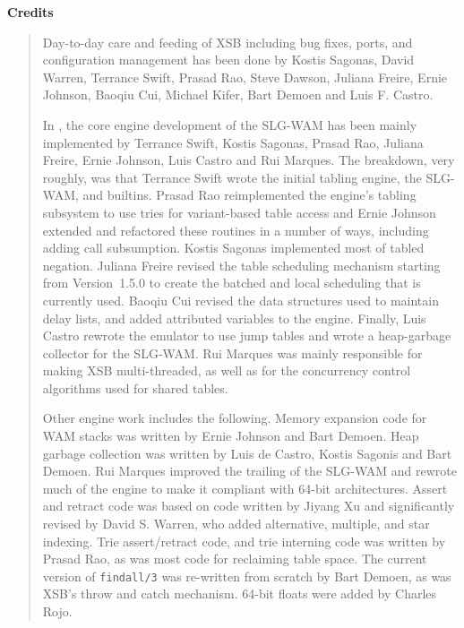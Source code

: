 \begin{center}
{\bf {\Large 
		Credits
}}
\end{center}


\begin{quote}
Day-to-day care and feeding of XSB including bug fixes, ports, and
configuration management has been done by Kostis Sagonas, David
Warren, Terrance Swift, Prasad Rao, Steve Dawson, Juliana Freire,
Ernie Johnson, Baoqiu Cui, Michael Kifer, Bart Demoen and Luis F.
Castro.

In \version, the core engine development of the SLG-WAM has been
mainly implemented by Terrance Swift, Kostis Sagonas, Prasad Rao,
Juliana Freire, Ernie Johnson, Luis Castro and Rui Marques.  The
breakdown, very roughly, was that Terrance Swift wrote the initial
tabling engine, the SLG-WAM, and builtins.  Prasad Rao reimplemented
the engine's tabling subsystem to use tries for variant-based table
access and Ernie Johnson extended and refactored these routines in a
number of ways, including adding call subsumption.  Kostis Sagonas
implemented most of tabled negation.  Juliana Freire revised the table
scheduling mechanism starting from Version~1.5.0 to create the batched
and local scheduling that is currently used.  Baoqiu Cui revised the
data structures used to maintain delay lists, and added attributed
variables to the engine.  Finally, Luis Castro rewrote the emulator to
use jump tables and wrote a heap-garbage collector for the SLG-WAM.
Rui Marques was mainly responsible for making XSB multi-threaded, as
well as for the concurrency control algorithms used for shared tables.

Other engine work includes the following.  Memory expansion code for
WAM stacks was written by Ernie Johnson and Bart Demoen.  Heap garbage
collection was written by Luis de Castro, Kostis Sagonis and Bart
Demoen.  Rui Marques improved the trailing of the SLG-WAM and rewrote
much of the engine to make it compliant with 64-bit architectures.
Assert and retract code was based on code written by Jiyang Xu and
significantly revised by David S. Warren, who added alternative,
multiple, and star indexing.  Trie assert/retract code, and trie
interning code was written by Prasad Rao, as was most code for
reclaiming table space. The current version of {\tt findall/3} was
re-written from scratch by Bart Demoen, as was XSB's throw and catch
mechanism.  64-bit floats were added by Charles Rojo.


\end{quote}
